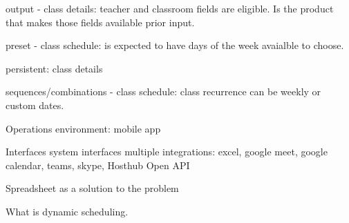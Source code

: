     output
        - class details: teacher and classroom fields are eligible. Is the product that makes those fields available prior input.

    preset
        - class schedule: is expected to have days of the week avaialble to choose.

    persistent:
        class details

    sequences/combinations
        - class schedule: class recurrence can be weekly or custom dates.

Operations
    environment: mobile app

Interfaces
    system interfaces
        multiple integrations: excel, google meet, google calendar, teams, skype, Hosthub Open API

Spreadsheet as a solution to the problem

What is dynamic scheduling.
